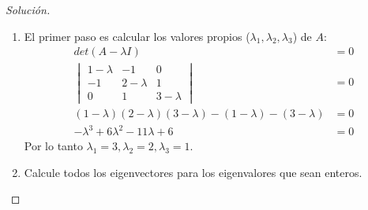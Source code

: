 \documentclass[12pt]{book}
\newenvironment{solucion}
  {\renewcommand\qedsymbol{$\square$}\begin{proof}[Solución]}
  {\end{proof}}
\begin{document}
\begin{solucion}

\renewcommand{\labelenumi}{(\alph{enumi})}
\begin{enumerate}
    \item El primer paso es calcular los valores propios ($\lambda_1,\lambda_2,\lambda_3$) de $A$:
        \begin{align*}
            det(A-\lambda I)&=0\\
            \begin{vmatrix}
                1-\lambda & -1 & 0\\
                -1 & 2-\lambda & 1\\
                0 & 1 & 3-\lambda
            \end{vmatrix} &=0\\
            (1-\lambda)(2-\lambda)(3-\lambda)-(1-\lambda)-(3-\lambda)&=0\\
            -\lambda^3+6\lambda^2-11\lambda+6&=0
        \end{align*}
        Por lo tanto $\lambda_1=3, \lambda_2=2, \lambda_3=1$.\\
    \item Calcule todos los eigenvectores para los eigenvalores que sean enteros.
\end{enumerate}


\end{solucion}
\end{document}
